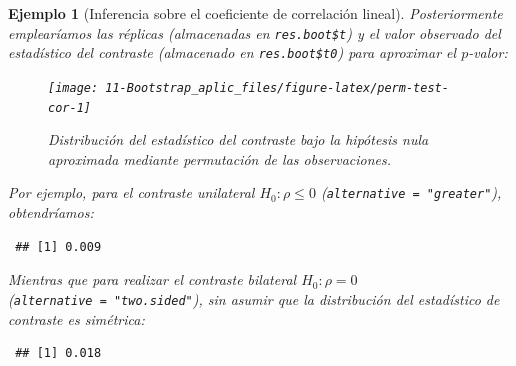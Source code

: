\documentclass[
  10pt,
]{book}
\newenvironment{Shaded}{\begin{snugshade}}{\end{snugshade}}
\newcommand{\AttributeTok}[1]{\textcolor[rgb]{0.77,0.63,0.00}{#1}}
\newcommand{\ConstantTok}[1]{\textcolor[rgb]{0.00,0.00,0.00}{#1}}
\newcommand{\DecValTok}[1]{\textcolor[rgb]{0.00,0.00,0.81}{#1}}
\newcommand{\FunctionTok}[1]{\textcolor[rgb]{0.00,0.00,0.00}{#1}}
\newcommand{\NormalTok}[1]{#1}
\newcommand{\OtherTok}[1]{\textcolor[rgb]{0.56,0.35,0.01}{#1}}
\newcommand{\SpecialCharTok}[1]{\textcolor[rgb]{0.00,0.00,0.00}{#1}}
\newcommand{\StringTok}[1]{\textcolor[rgb]{0.31,0.60,0.02}{#1}}
\theoremstyle{break}
\newtheorem{example}{Ejemplo}[chapter]
\theoremstyle{nonumberplain}
\begin{document}
\begin{example}[Inferencia sobre el coeficiente de correlación lineal]
Posteriormente emplearíamos las réplicas (almacenadas en \texttt{res.boot\$t}) y el valor
observado del estadístico del contraste (almacenado en \texttt{res.boot\$t0})
para aproximar el \(p\)-valor:

\begin{Shaded}
\end{Shaded}

\begin{figure}[!htbp]

{\centering \texttt{[image: 11-Bootstrap\_aplic\_files/figure-latex/perm-test-cor-1]} 

}

\caption{Distribución del estadístico del contraste bajo la hipótesis nula aproximada mediante permutación de las observaciones.}\label{fig:perm-test-cor}
\end{figure}

Por ejemplo, para el contraste unilateral \(H_0: \rho \leq 0\)
(\texttt{alternative\ =\ "greater"}), obtendríamos:

\begin{Shaded}
\end{Shaded}

\begin{verbatim}
 ## [1] 0.009
\end{verbatim}

Mientras que para realizar el contraste bilateral \(H_0: \rho = 0\)
(\texttt{alternative\ =\ "two.sided"}), sin asumir que
la distribución del estadístico de contraste es simétrica:

\begin{Shaded}
\end{Shaded}

\begin{verbatim}
 ## [1] 0.018
\end{verbatim}

\end{example}
\end{document}
